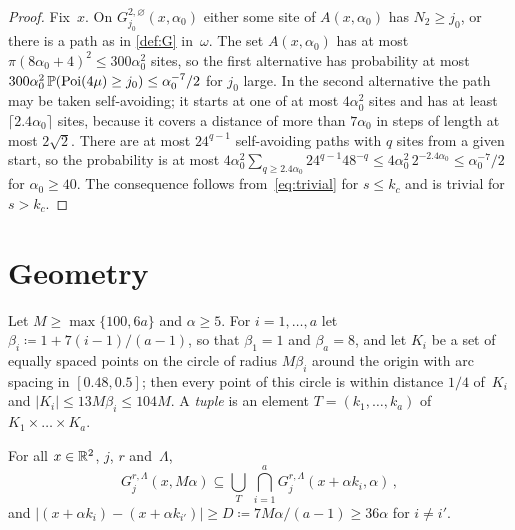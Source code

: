 \documentclass[11pt,letterpaper]{article}
\begin{document}
\begin{proof}
Fix~$x$. On $G^{2,\varnothing}_{j_0}(x,\alpha_0)$ either some site of $A(x,\alpha_0)$ has $N_2\ge j_0$, or there is a path as in \cref{def:G} in~$\omega$. The set $A(x,\alpha_0)$ has at most $\pi(8\alpha_0+4)^2\le300\alpha_0^2$ sites, so the first alternative has probability at most $300\alpha_0^2\,\P(\mathrm{Poi}(4\mu)\ge j_0)\le\alpha_0^{-7}/2$ for $j_0$ large. In the second alternative the path may be taken self-avoiding; it starts at one of at most $4\alpha_0^2$ sites and has at least $\lceil2.4\alpha_0\rceil$ sites, because it covers a distance of more than $7\alpha_0$ in steps of length at most $2\sqrt2$. There are at most $24^{q-1}$ self-avoiding paths with $q$ sites from a given start, so the probability is at most $4\alpha_0^2\sum_{q\ge2.4\alpha_0}24^{q-1}48^{-q}\le4\alpha_0^2\,2^{-2.4\alpha_0}\le\alpha_0^{-7}/2$ for $\alpha_0\ge40$. The consequence follows from~\eqref{eq:trivial} for $s\le k_c$ and is trivial for $s>k_c$.
\end{proof}

\section{Geometry}
\label{sec:geometry}

Let $M\ge\max\{100,6a\}$ and $\alpha\ge5$. For $i=1,\dots,a$ let $\beta_i\coloneqq1+7(i-1)/(a-1)$, so that $\beta_1=1$ and $\beta_a=8$, and let $K_i$ be a set of equally spaced points on the circle of radius $M\beta_i$ around the origin with arc spacing in $[0.48,0.5]$; then every point of this circle is within distance $1/4$ of~$K_i$ and $\lvert K_i\rvert\le13M\beta_i\le104M$. A \emph{tuple} is an element $T=(k_1,\dots,k_a)$ of $K_1\times\dots\times K_a$.

\begin{lemma}[Inclusion]
\label{lem:inclusion}
For all $x\in\R^2$, $j$, $r$ and~$\Lambda$,
\begin{equation}
\label{eq:inclusion}
  G_j^{r,\Lambda}(x,M\alpha)\subseteq\bigcup_{T}\ \bigcap_{i=1}^{a}G_j^{r,\Lambda}(x+\alpha k_i,\alpha)\,,
\end{equation}
and $\lvert(x+\alpha k_i)-(x+\alpha k_{i'})\rvert\ge D\coloneqq7M\alpha/(a-1)\ge36\alpha$ for $i\neq i'$.
\end{lemma}
\end{document}
